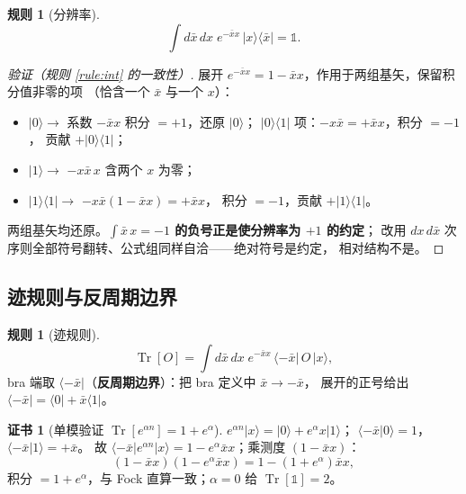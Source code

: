 \documentclass[11pt,a4paper]{ctexart}
\newcommand{\Tr}{\operatorname{Tr}}
\theoremstyle{plain}
\theoremstyle{definition}
\newtheorem{rulethm}[identity]{规则}
\newtheorem{checkcert}[identity]{证书}
\theoremstyle{remark}
\begin{document}
\begin{rulethm}[分辨率]\label{rule:res}
\begin{equation}
\int d\bar x\, dx\; e^{-\bar x x}\, |x\rangle\langle\bar x| = \mathbb{1}.
\label{eq:res}
\end{equation}
\end{rulethm}

\begin{proof}[验证（规则 \ref{rule:int} 的一致性）]
展开 $e^{-\bar x x} = 1 - \bar x x$，作用于两组基矢，保留积分值非零的项
（恰含一个 $\bar x$ 与一个 $x$）：
\begin{itemize}
\item $|0\rangle \to$ 系数 $-\bar x x$ 积分 $= +1$，还原 $|0\rangle$；
      $|0\rangle\langle1|$ 项：$-x\bar x = +\bar x x$，积分 $= -1$，
      贡献 $+|0\rangle\langle1|$；
\item $|1\rangle \to$ $-x\bar x\,x$ 含两个 $x$ 为零；
\item $|1\rangle\langle1| \to$ $-x\bar x(1 - \bar x x) = +\bar x x$，
      积分 $= -1$，贡献 $+|1\rangle\langle1|$。
\end{itemize}
两组基矢均还原。\textbf{$\int \bar x\,x = -1$ 的负号正是使分辨率为 $+1$ 的约定}；
改用 $dx\,d\bar x$ 次序则全部符号翻转、公式组同样自洽——绝对符号是约定，
相对结构不是。
\end{proof}

\subsection{迹规则与反周期边界}

\begin{rulethm}[迹规则]\label{rule:trace}
\begin{equation}
\Tr[O] = \int d\bar x\, dx\; e^{-\bar x x}\,\langle-\bar x|\,O\,|x\rangle ,
\label{eq:trace}
\end{equation}
bra 端取 $\langle-\bar x|$（\textbf{反周期边界}）：把 bra 定义中 $\bar x \to -\bar x$，
展开的正号给出 $\langle-\bar x| = \langle0| + \bar x\langle1|$。
\end{rulethm}

\begin{checkcert}[{单模验证 $\Tr[e^{\alpha n}] = 1 + e^{\alpha}$}]\label{chk:trace}
$e^{\alpha n}|x\rangle = |0\rangle + e^{\alpha}x|1\rangle$；
$\langle-\bar x|0\rangle = 1$，$\langle-\bar x|1\rangle = +\bar x$。
故 $\langle-\bar x|e^{\alpha n}|x\rangle = 1 - e^{\alpha}\bar x x$；乘测度
$(1 - \bar x x)$：
\begin{equation*}
(1 - \bar x x)(1 - e^{\alpha}\bar x x) = 1 - (1 + e^{\alpha})\bar x x ,
\end{equation*}
积分 $= 1 + e^{\alpha}$，与 Fock 直算一致；$\alpha = 0$ 给
$\Tr[\mathbb{1}] = 2$。
\end{checkcert}
\end{document}
